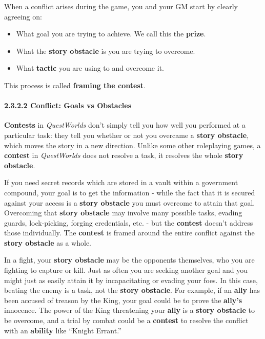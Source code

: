 \documentclass[
]{article}
\providecommand{\tightlist}{%
  \setlength{\itemsep}{0pt}\setlength{\parskip}{0pt}}
\begin{document}
When a conflict arises during the game, you and your GM start by clearly
agreeing on:

\begin{itemize}
\tightlist
\item
  What goal you are trying to achieve. We call this the \textbf{prize}.
\item
  What the \textbf{story obstacle} is you are trying to overcome.
\item
  What \textbf{tactic} you are using to and overcome it.
\end{itemize}

This process is called \textbf{framing the contest}.

\hypertarget{conflict-goals-vs-obstacles}{%
\paragraph{2.3.2.2 Conflict: Goals vs
Obstacles}\label{conflict-goals-vs-obstacles}}

\textbf{Contests} in \emph{QuestWorlds} don't simply tell you how well
you performed at a particular task: they tell you whether or not you
overcame a \textbf{story obstacle}, which moves the story in a new
direction. Unlike some other roleplaying games, a \textbf{contest} in
\emph{QuestWorlds} does not resolve a task, it resolves the whole
\textbf{story obstacle}.

If you need secret records which are stored in a vault within a
government compound, your goal is to get the information - while the
fact that it is secured against your access is a \textbf{story obstacle}
you must overcome to attain that goal. Overcoming that \textbf{story
obstacle} may involve many possible tasks, evading guards, lock-picking,
forging credentials, etc. - but the \textbf{contest} doesn't address
those individually. The \textbf{contest} is framed around the entire
conflict against the \textbf{story obstacle} as a whole.

In a fight, your \textbf{story obstacle} may be the opponents
themselves, who you are fighting to capture or kill. Just as often you
are seeking another goal and you might just as easily attain it by
incapacitating or evading your foes. In this case, beating the enemy is
a task, not the \textbf{story obstacle}. For example, if an
\textbf{ally} has been accused of treason by the King, your goal could
be to prove the \textbf{ally's} innocence. The power of the King
threatening your \textbf{ally} is a \textbf{story obstacle} to be
overcome, and a trial by combat could be a \textbf{contest} to resolve
the conflict with an \textbf{ability} like ``Knight Errant.''
\end{document}

